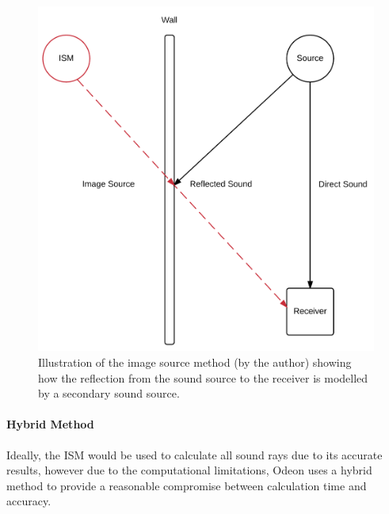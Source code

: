 \documentclass[../../main.tex]{subfiles}
\begin{document}


			\begin{figure}[H]
				\center\includegraphics[scale = 0.4]{Sections/Background/images/ISM.png}
				\caption{Illustration of the image source method (by the author) showing how the reflection from the sound source to the receiver is modelled by a secondary sound source.}
				\label{ISMPic}
			\end{figure}

		\paragraph{Hybrid Method}

			Ideally, the \ac{ISM} would be used to calculate all sound rays due to its accurate results, however due to the computational limitations, Odeon uses a hybrid method to provide a reasonable compromise between calculation time and accuracy.
\end{document}

